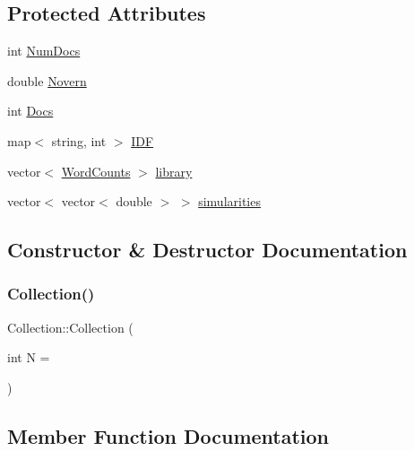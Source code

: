 \subsection*{Protected Attributes}
\begin{DoxyCompactItemize}
\item 
int \hyperlink{class_collection_ad1eac1bd661969e31c8b195e1efc1051}{Num\+Docs}
\item 
double \hyperlink{class_collection_aad698dbd68dbc0031eceadf885bac9ee}{Novern}
\item 
int \hyperlink{class_collection_a4fba917ef63c2afab571d6d633900451}{Docs}
\item 
map$<$ string, int $>$ \hyperlink{class_collection_a6c88fe997e89b4c063face18eda3906a}{I\+DF}
\item 
vector$<$ \hyperlink{class_word_counts}{Word\+Counts} $>$ \hyperlink{class_collection_a33713580ff78f8b306b243a552609a3d}{library}
\item 
vector$<$ vector$<$ double $>$ $>$ \hyperlink{class_collection_ae47083f6b3d9bc58d31455855e1f0673}{simularities}
\end{DoxyCompactItemize}


\subsection{Constructor \& Destructor Documentation}
\mbox{\label{class_collection_a1f1f84178b666f0cb08d58c362473566}} 
\subsubsection{\texorpdfstring{Collection()}{Collection()}}
{\footnotesize\ttfamily Collection\+::\+Collection (\begin{DoxyParamCaption}\item[{int}]{N = {} }\end{DoxyParamCaption})}



\subsection{Member Function Documentation}
\mbox{\label{class_collection_a9e83d26623d9125ec37f84be550e2bcd}} 
